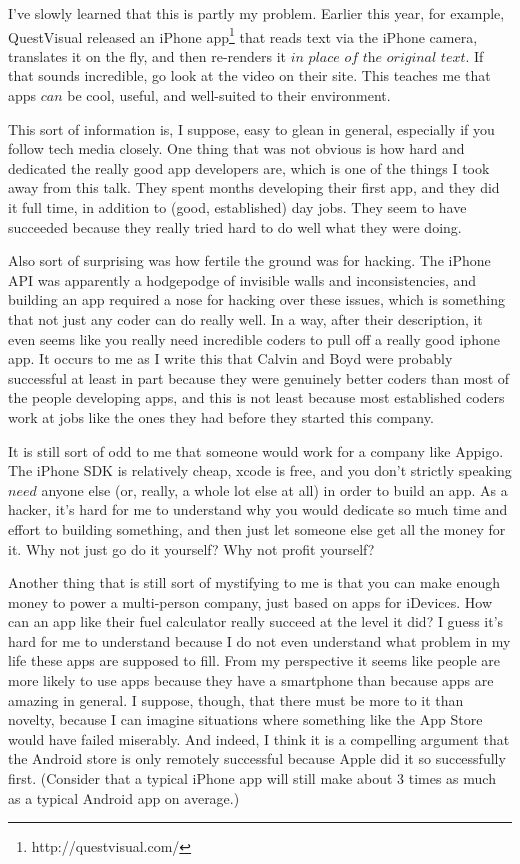 \documentclass[a4paper]{article}
\begin{document}
I've slowly learned that this is partly my problem. Earlier this year, for example, QuestVisual released an iPhone app\footnote[1]{http://questvisual.com/} that reads text via the iPhone camera, translates it on the fly, and then re-renders it $\textit{in place of the original text}$. If that sounds incredible, go look at the video on their site. This teaches me that apps $\textit{can}$ be cool, useful, and well-suited to their environment.

This sort of information is, I suppose, easy to glean in general, especially if you follow tech media closely. One thing that was not obvious is how hard and dedicated the really good app developers are, which is one of the things I took away from this talk. They spent months developing their first app, and they did it full time, in addition to (good, established) day jobs. They seem to have succeeded because they really tried hard to do well what they were doing.

Also sort of surprising was how fertile the ground was for hacking. The iPhone API was apparently a hodgepodge of invisible walls and inconsistencies, and building an app required a nose for hacking over these issues, which is something that not just any coder can do really well. In a way, after their description, it even seems like you really need incredible coders to pull off a really good iphone app. It occurs to me as I write this that Calvin and Boyd were probably successful at least in part because they were genuinely better coders than most of the people developing apps, and this is not least because most established coders work at jobs like the ones they had before they started this company.

It is still sort of odd to me that someone would work for a company like Appigo. The iPhone SDK is relatively cheap, xcode is free, and you don't strictly speaking $\textit{need}$ anyone else (or, really, a whole lot else at all) in order to build an app. As a hacker, it's hard for me to understand why you would dedicate so much time and effort to building something, and then just let someone else get all the money for it. Why not just go do it yourself? Why not profit yourself?

Another thing that is still sort of mystifying to me is that you can make enough money to power a multi-person company, just based on apps for iDevices. How can an app like their fuel calculator really succeed at the level it did? I guess it's hard for me to understand because I do not even understand what problem in my life these apps are supposed to fill. From my perspective it seems like people are more likely to use apps because they have a smartphone than because apps are amazing in general. I suppose, though, that there must be more to it than novelty, because I can imagine situations where something like the App Store would have failed miserably. And indeed, I think it is a compelling argument that the Android store is only remotely successful because Apple did it so successfully first. (Consider that a typical iPhone app will still make about 3 times as much as a typical Android app on average.)
\end{document}
